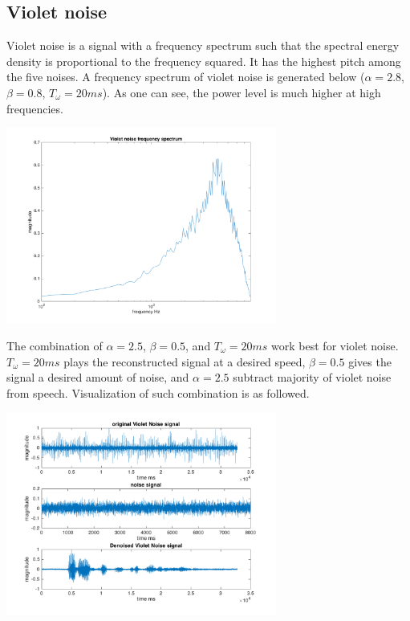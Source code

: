 \documentclass[journal]{IEEEtran}
\begin{document}
\subsection{Violet noise}
\begin{flushleft}
Violet noise is a signal with a frequency spectrum such that the spectral energy density is proportional to the frequency squared. It has the highest pitch among the five noises. A frequency spectrum of violet noise is generated below ($\alpha = 2.8$, $\beta = 0.8$, $T_\omega = 20ms$). As one can see, the power level is much higher at high frequencies.
\end{flushleft}
\centering 
\includegraphics[width=3.5in]{violetnoise_log}
\begin{flushleft}
The combination of $\alpha = 2.5$, $\beta = 0.5$, and $T_\omega = 20ms$ work best for violet noise. $T_\omega = 20ms$ plays the reconstructed signal at a desired speed, $\beta = 0.5$ gives the signal a desired amount of noise, and $\alpha = 2.5$ subtract majority of violet noise from speech. Visualization of such combination is as followed. 
\end{flushleft}
\centering 
\includegraphics[width=3.5in]{violetNoise}
\end{document}
